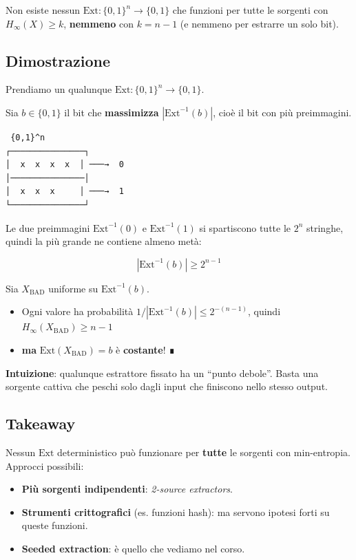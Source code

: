 Non esiste nessun \(\text{Ext}: \{0,1\}^n \to \{0,1\}\) che funzioni per tutte le sorgenti con \(H_\infty(X) \ge k\), \textbf{nemmeno} con \(k = n - 1\) (e nemmeno per estrarre un solo bit).

\subsection{Dimostrazione}

Prendiamo un qualunque \(\text{Ext}: \{0,1\}^n \to \{0,1\}\).

Sia \(b \in \{0,1\}\) il bit che \textbf{massimizza} \(|\text{Ext}^{-1}(b)|\), cioè il bit con più preimmagini.

\begin{verbatim}
 {0,1}^n
┌───────────────┐
│  x  x  x  x  │ ───→  0
│───────────────│
│  x  x  x     │ ───→  1
└───────────────┘
\end{verbatim}

Le due preimmagini \(\text{Ext}^{-1}(0)\) e \(\text{Ext}^{-1}(1)\) si spartiscono tutte le \(2^n\) stringhe, quindi la più grande ne contiene almeno metà:

\[
|\text{Ext}^{-1}(b)| \ge 2^{n-1}
\]

Sia \(X_{\text{BAD}}\) uniforme su \(\text{Ext}^{-1}(b)\).

\begin{itemize}
\tightlist
\item
  Ogni valore ha probabilità \(1/|\text{Ext}^{-1}(b)| \le 2^{-(n-1)}\), quindi \(H_\infty(X_{\text{BAD}}) \ge n - 1\)
\item
  \textbf{ma} \(\text{Ext}(X_{\text{BAD}}) = b\) è \textbf{costante}! ∎
\end{itemize}

\textbf{Intuizione}: qualunque estrattore fissato ha un ``punto debole''. Basta una sorgente cattiva che peschi solo dagli input che finiscono nello stesso output.

\subsection{Takeaway}

Nessun \(\text{Ext}\) deterministico può funzionare per \textbf{tutte} le sorgenti con min-entropia. Approcci possibili:

\begin{itemize}
\tightlist
\item
  \textbf{Più sorgenti indipendenti}: \emph{2-source extractors}.
\item
  \textbf{Strumenti crittografici} (es. funzioni hash): ma servono ipotesi forti su queste funzioni.
\item
  \textbf{Seeded extraction}: è quello che vediamo nel corso.
\end{itemize}

